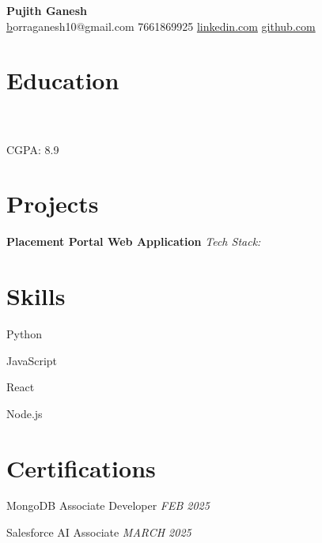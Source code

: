 \documentclass[a4paper,10pt]{article}
\begin{document}
\begin{center}
    {\huge \textbf{ Pujith Ganesh }} \\
    \vspace{5pt}
    \small \href{mailto:borraganesh10@gmail.com } borraganesh10@gmail.com \quad \textbullet{} 7661869925 \quad  \quad \textbullet{} \href{ https://www.linkedin.com/in/ganesh10-/ }{linkedin.com} \quad \textbullet{} \href{ https://github.com/ganesh10-code }{github.com}
\end{center}

\section*{Education}

\noindent
\textbf{  } \\
\textit{  } \hfill \textit{  } \\
 CGPA: 8.9 \\ 
\vspace{0.3cm}



\section*{Projects}

\noindent
\textbf{ Placement Portal Web Application } \hfill \textit{Tech Stack:  } \\
\vspace{5pt} \textit{  }
\begin{compactitem}
    \item 
\end{compactitem}




\section*{Skills}
\noindent
\begin{compactitem}
    
        \item Python
    
        \item JavaScript
    
        \item React
    
        \item Node.js
    
\end{compactitem}



\section*{Certifications}
\noindent
\begin{compactitem}
    
        \item MongoDB Associate Developer \hfill \textit{ FEB 2025 }
    
        \item Salesforce AI Associate \hfill \textit{ MARCH 2025 }
    
\end{compactitem}
\end{document}
